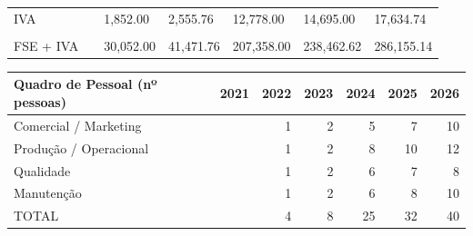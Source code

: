 \documentclass[11pt]{article}
\begin{document}
\begin{adjustbox}{center}
\begin{tabular}{|l|l|l|l|l|l|l|l|l|l|l|}
			&          &         &        &              &      &           &           &            &            &            \\ \hline
			\multicolumn{5}{|l|}{IVA}                                                                &      & 1,852.00  & 2,555.76  & 12,778.00  & 14,695.00  & 17,634.74  \\ \hline
			&          &         &        &              &      &           &           &            &            &            \\ \hline
			\multicolumn{5}{|l|}{FSE + IVA}                                                          &      & 30,052.00 & 41,471.76 & 207,358.00 & 238,462.62 & 286,155.14 \\ \hline
		\end{tabular}
	\end{adjustbox}

	\normalsize
	\begin{center}
		\begin{tabular}{|l|l|r|r|r|r|r|}
			\hline
			Quadro de Pessoal (nº pessoas) & 2021 & \multicolumn{1}{l|}{2022} & \multicolumn{1}{l|}{2023} & \multicolumn{1}{l|}{2024} & \multicolumn{1}{l|}{2025} & \multicolumn{1}{l|}{2026} \\ \hline
			Comercial / Marketing          &      & 1                         & 2                         & 5                         & 7                         & 10                        \\ \hline
			Produção / Operacional         &      & 1                         & 2                         & 8                         & 10                        & 12                        \\ \hline
			Qualidade                      &      & 1                         & 2                         & 6                         & 7                         & 8                         \\ \hline
			Manutenção                     &      & 1                         & 2                         & 6                         & 8                         & 10                        \\ \hline
			TOTAL                          &      & 4                         & 8                         & 25                        & 32                        & 40                        \\ \hline
		\end{tabular}
	\end{center}
	
\end{document}
